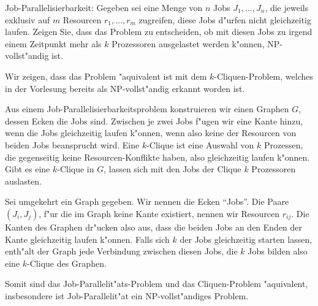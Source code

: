 Job-Parallelisierbarkeit:
Gegeben sei eine Menge von $n$ Jobs $J_1,\dots,J_n$, die jeweils exklusiv
auf $m$ Resourcen $r_1,\dots,r_m$ zugreifen, diese Jobs d"urfen
nicht gleichzeitig laufen. Zeigen Sie, dass das Problem zu entscheiden,
ob mit diesen Jobs zu irgend einem Zeitpunkt mehr als $k$ Prozessoren
ausgelastet werden k"onnen, NP-vollst"andig ist.

\begin{loesung}
Wir zeigen, dass das Problem "aquivalent ist mit dem $k$-Cliquen-Problem,
welches in der Vorlesung bereits als NP-vollst"andig erkannt worden ist.

Aus einem Job-Parallelisierbarkeitsproblem konstruieren wir einen Graphen $G$,
dessen Ecken die Jobs sind. Zwischen je zwei Jobs f"ugen wir eine
Kante hinzu, wenn die Jobs gleichzeitig laufen k"onnen, wenn also
keine der Resourcen von beiden Jobs beansprucht wird. Eine $k$-Clique
ist eine Auswahl von $k$ Prozessen, die gegenseitig keine Resourcen-Konflikte
haben, also gleichzeitig laufen k"onnen. Gibt es eine $k$-Clique in $G$,
lassen sich mit den Jobs der Clique $k$ Prozessoren auslasten.

Sei umgekehrt ein Graph gegeben. Wir nennen die Ecken ``Jobs''. Die
Paare $(J_i,J_j)$, f"ur die im Graph keine Kante existiert,  nennen
wir Resourcen $r_{ij}$. Die Kanten des Graphen dr"ucken also aus, dass
die beiden Jobs an den Enden der Kante gleichzeitig laufen k"onnen.
Falls sich $k$ der Jobs gleichzeitig starten lassen, enth"alt der
Graph jede Verbindung zwischen diesen Jobs, die $k$ Jobs bilden also
eine $k$-Clique des Graphen.

Somit sind das Job-Parallelit"ats-Problem und das Cliquen-Problem
"aquivalent, insbesondere ist Job-Parallelit"at ein NP-vollst"andiges
Problem.
\end{loesung}
